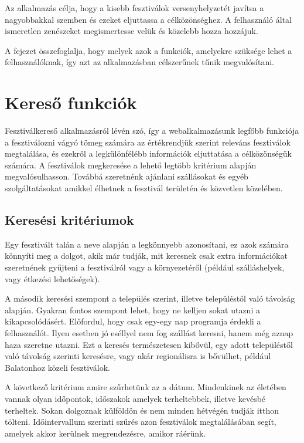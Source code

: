 

Az alkalmazás célja, hogy a kisebb fesztiválok versenyhelyzetét javítsa a nagyobbakkal szemben és ezeket eljuttassa a célközönséghez. A felhasználó által ismeretlen zenészeket megismertesse velük és közelebb hozza hozzájuk.

A fejezet összefoglalja, hogy melyek azok a funkciók, amelyekre szüksége lehet a felhasználóknak, így azt az alkalmazásban célszerűnek tűnik megvalósítani.

\section{Kereső funkciók}

Fesztiválkereső alkalmazásról lévén szó, így a webalkalmazásunk legfőbb funkciója a fesztiválozni vágyó tömeg számára az értékrendjük szerint releváns fesztiválok megtalálása, és ezekről a legkülönfélébb információk eljuttatása a célközönségük számára. A fesztiválok megkeresése a lehető legtöbb kritérium alapján megvalósulhasson. Továbbá szeretnénk ajánlani szállásokat és egyéb szolgáltatásokat amikkel élhetnek a fesztivál területén és közvetlen közelében.

\subsection{Keresési kritériumok}

Egy fesztivált talán a neve alapján a legkönnyebb azonosítani, ez azok számára könnyíti meg a dolgot, akik már tudják, mit keresnek csak extra információkat szeretnének gyűjteni a fesztiválról vagy a környezetéről (például szálláshelyek, vagy étkezési lehetőségek).

A második keresési szempont a település szerint, illetve településtől való távolság alapján. Gyakran fontos szempont lehet, hogy ne kelljen sokat utazni a kikapcsolódásért. Előfordul, hogy csak egy-egy nap programja érdekli a felhasználót. Ilyen esetben jó eséllyel nem fog szállást keresni, hanem még aznap haza szeretne utazni. Ezt a keresés természetesen kibővül, egy adott településtől való távolság szerinti keresésre, vagy akár regionálisra is bővülhet, például Balatonhoz közeli fesztiválok.

A következő kritérium amire szűrhetünk az a dátum. Mindenkinek az életében vannak olyan időpontok, időszakok amelyek terheltebbek, illetve kevésbé terheltek. Sokan dolgoznak külföldön és nem minden hétvégén tudják itthon tölteni. Időintervallum szerinti szűrés azon fesztiválok megtalálásában segít, amelyek akkor kerülnek megrendezésre, amikor ráérünk.

